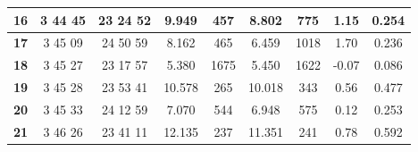 \documentclass[12pt]{article}
\begin{document}
\begin{table}[H]
{\begin{tabular}{|c|c|c|c|c|c|c|c|c|}
        \textbf{16}   & 3  44  45                                                        & 23  24  52                                                         & 9.949      & 457                                                        & 8.802      & 775                                                        & 1.15         & 0.254                                                            \\ \hline
        \textbf{17}   & 3  45  09                                                        & 24  50  59                                                         & 8.162      & 465                                                        & 6.459      & 1018                                                       & 1.70         & 0.236                                                            \\ \hline
        \textbf{18}   & 3  45  27                                                        & 23  17  57                                                         & 5.380      & 1675                                                       & 5.450      & 1622                                                       & -0.07        & 0.086                                                            \\ \hline
        \textbf{19}   & 3  45  28                                                        & 23  53  41                                                         & 10.578     & 265                                                        & 10.018     & 343                                                        & 0.56         & 0.477                                                            \\ \hline
        \textbf{20}   & 3  45  33                                                        & 24  12  59                                                         & 7.070      & 544                                                        & 6.948      & 575                                                        & 0.12         & 0.253                                                            \\ \hline
        \textbf{21}   & 3  46  26                                                        & 23  41  11                                                         & 12.135     & 237                                                        & 11.351     & 241                                                        & 0.78         & 0.592                                                            \\ \hline

\end{tabular}}
\end{table}
\end{document}
